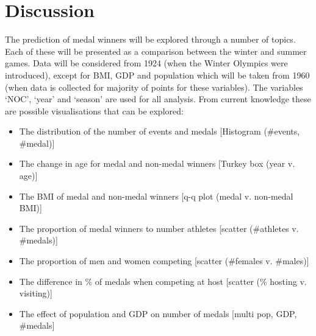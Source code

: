 \documentclass[a4 paper, 12pt]{article}
\begin{document}
\section{Discussion}
The prediction of medal winners will be explored through a number of topics. Each of these will be presented as a comparison between the winter and summer games. Data will be considered from 1924 (when the Winter Olympics were introduced), except for BMI, GDP and population which will be taken from 1960 (when data is collected for majority of points for these variables). The variables ‘NOC’, ‘year’ and ‘season’ are used for all analysis. From current knowledge these are possible visualisations that can be explored:
    \begin{itemize}
        \item The distribution of the number of events and medals [Histogram (\#events, \#medal)]
        


        
        \item The change in age for medal and non-medal winners [Turkey box (year v. age)]
        \item The BMI of medal and non-medal winners [q-q plot (medal v. non-medal BMI)]
        \item The proportion of medal winners to number athletes [scatter (\#athletes v. \#medals)]
        \item The proportion of men and women competing [scatter (\#females v. \#males)]
        \item The difference in \% of medals when competing at host [scatter (\% hosting v. visiting)]
        \item The effect of population and GDP on number of medals [multi \- pop, GDP, \#medals]
    \end{itemize}




\pagebreak
\appendix
\addappheadtotoc
\appendixpage
\end{document}
